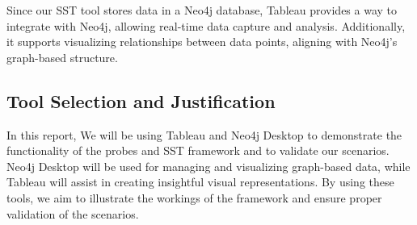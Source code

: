 Since our SST tool stores data in a Neo4j database, Tableau provides a way to integrate with Neo4j, allowing real-time data capture and analysis. Additionally, it supports visualizing relationships between data points, aligning with Neo4j's graph-based structure.

\subsection{Tool Selection and Justification}

In this report, We will be using Tableau and Neo4j Desktop to demonstrate the functionality of the probes and SST framework and to validate our scenarios. Neo4j Desktop will be used for managing and visualizing graph-based data, while Tableau will assist in creating insightful visual representations. By using these tools, we aim to illustrate the workings of the framework and ensure proper validation of the scenarios.






